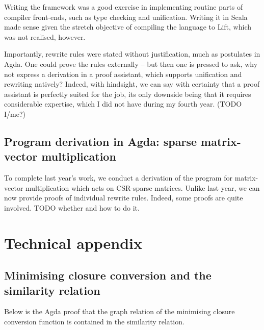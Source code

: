\documentclass[bsc,frontabs,oneside,singlespacing,parskip,deptreport]{infthesis}
\theoremstyle{definition}
\begin{document}
Writing the framework was a good exercise in implementing routine
parts of compiler front-ends, such as type checking and
unification. Writing it in Scala made sense given the stretch
objective of compiling the language to Lift, which was not realised,
however.

Importantly, rewrite rules were stated without justification, much as
postulates in Agda. One could prove the rules externally – but then
one is pressed to ask, why not express a derivation in a proof
assistant, which supports unification and rewriting natively? Indeed,
with hindsight, we can say with certainty that a proof assistant is
perfectly suited for the job, its only downside being that it requires
considerable expertise, which I did not have during my fourth
year. (TODO I/me?)

\section{Program derivation in Agda: sparse matrix-vector
  multiplication}
\label{sec:progr-deriv-agda}

To complete last year's work, we conduct a derivation of the program
for matrix-vector multiplication which acts on CSR-sparse
matrices. Unlike last year, we can now provide proofs of individual
rewrite rules. Indeed, some proofs are quite involved. TODO whether
and how to do it.




\chapter{Technical appendix}
\label{cha:technical-appendix}

\section{Minimising closure conversion and the similarity relation}
\label{sec:minim-clos-conv-2}

Below is the Agda proof that the graph relation of the minimising
closure conversion function is contained in the similarity relation.

\end{document}
